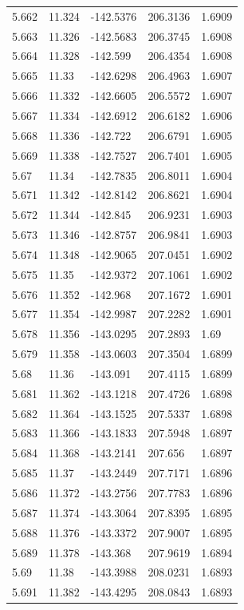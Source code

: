 \begin{tabular}{lllll}
5.662 & 11.324 & -142.5376 & 206.3136 & 1.6909 \\
5.663 & 11.326 & -142.5683 & 206.3745 & 1.6908 \\
5.664 & 11.328 & -142.599 & 206.4354 & 1.6908 \\
5.665 & 11.33 & -142.6298 & 206.4963 & 1.6907 \\
5.666 & 11.332 & -142.6605 & 206.5572 & 1.6907 \\
5.667 & 11.334 & -142.6912 & 206.6182 & 1.6906 \\
5.668 & 11.336 & -142.722 & 206.6791 & 1.6905 \\
5.669 & 11.338 & -142.7527 & 206.7401 & 1.6905 \\
5.67 & 11.34 & -142.7835 & 206.8011 & 1.6904 \\
5.671 & 11.342 & -142.8142 & 206.8621 & 1.6904 \\
5.672 & 11.344 & -142.845 & 206.9231 & 1.6903 \\
5.673 & 11.346 & -142.8757 & 206.9841 & 1.6903 \\
5.674 & 11.348 & -142.9065 & 207.0451 & 1.6902 \\
5.675 & 11.35 & -142.9372 & 207.1061 & 1.6902 \\
5.676 & 11.352 & -142.968 & 207.1672 & 1.6901 \\
5.677 & 11.354 & -142.9987 & 207.2282 & 1.6901 \\
5.678 & 11.356 & -143.0295 & 207.2893 & 1.69 \\
5.679 & 11.358 & -143.0603 & 207.3504 & 1.6899 \\
5.68 & 11.36 & -143.091 & 207.4115 & 1.6899 \\
5.681 & 11.362 & -143.1218 & 207.4726 & 1.6898 \\
5.682 & 11.364 & -143.1525 & 207.5337 & 1.6898 \\
5.683 & 11.366 & -143.1833 & 207.5948 & 1.6897 \\
5.684 & 11.368 & -143.2141 & 207.656 & 1.6897 \\
5.685 & 11.37 & -143.2449 & 207.7171 & 1.6896 \\
5.686 & 11.372 & -143.2756 & 207.7783 & 1.6896 \\
5.687 & 11.374 & -143.3064 & 207.8395 & 1.6895 \\
5.688 & 11.376 & -143.3372 & 207.9007 & 1.6895 \\
5.689 & 11.378 & -143.368 & 207.9619 & 1.6894 \\
5.69 & 11.38 & -143.3988 & 208.0231 & 1.6893 \\
5.691 & 11.382 & -143.4295 & 208.0843 & 1.6893 \\

\end{tabular}
